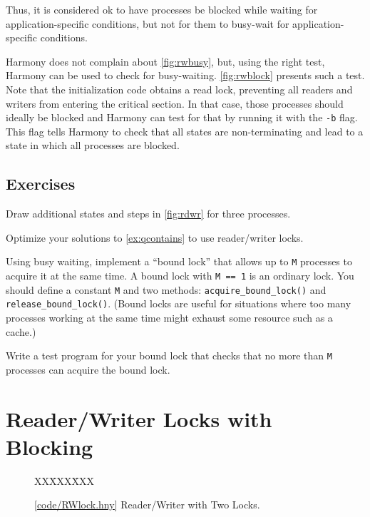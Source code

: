 \documentclass{report}
\newcommand{\harmonysource}[1]{
\begin{tabbing}
XX\=XXX\=XXX\kill
    
\end{tabbing}
}
\newcommand{\harmonylink}[1]{%
[\href{https://www.cs.cornell.edu/home/rvr/harmony/#1}{\underline{#1}}]%
}
\newenvironment{code}{
\tcolorbox
}{
\endtcolorbox
}
\begin{document}
Thus, it is considered ok to have processes be blocked while waiting
for application-specific conditions, but not for them to
busy-wait for application-specific conditions.

Harmony does not complain about \autoref{fig:rwbusy}, but, using
the right test, Harmony can be used to check for busy-waiting.
\autoref{fig:rwblock} presents such a test.
Note that the initialization code obtains a read lock, preventing
all readers and writers from entering the critical section.
In that case, those processes should ideally be blocked and Harmony
can test for that by running it with the \texttt{-b} flag.
This flag tells Harmony to check
that all states are non-terminating and lead to a state in which
all processes are blocked.

\section*{Exercises}
\begin{problems}
\item Draw additional states and steps in \autoref{fig:rdwr}
for three processes.
\item Optimize your solutions to \autoref{ex:qcontains} to use reader/writer locks.
\item \label{ex:boundlock} Using busy waiting, implement a ``bound lock'' that allows
up to \texttt{M} processes to acquire it at the same time.  A bound lock
with \texttt{M == 1} is an ordinary lock.
You should define a constant \texttt{M} and two methods:
\texttt{acquire\_bound\_lock()}
and \texttt{release\_bound\_lock()}.
(Bound locks are useful for situations where too many processes working
at the same time might exhaust some resource such as a cache.)
\item Write a test program for your bound lock
that checks that no more than \texttt{M} processes can acquire the
bound lock.
\end{problems}

\chapter{Reader/Writer Locks with Blocking}
\label{ch:rdwr2}

\begin{figure}
\begin{code}
\harmonysource{RWlock}
\end{code}
\caption{\harmonylink{code/RWlock.hny} Reader/Writer with Two Locks.}
\label{fig:rw2lock}
\end{figure}
\end{document}
